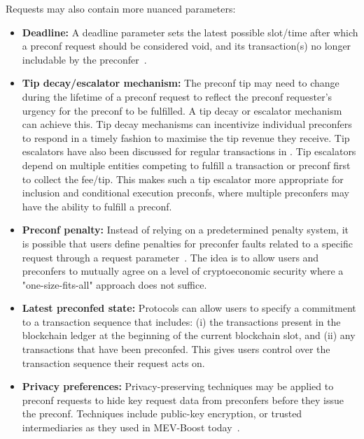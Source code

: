 \documentclass[a4paper]{article}
\theoremstyle{boldstyle}
\begin{document}
    Requests may also contain more nuanced parameters:
    \begin{itemize}
        \item \textbf{Deadline:} A deadline parameter sets the latest possible slot/time after which a preconf request should be considered void, and its transaction(s) no longer includable by the preconfer~\cite{W:PreconfirmationsforVanillaBasedRollups}.
        
        \item \textbf{Tip decay/escalator mechanism:} 
        The preconf tip may need to change during the lifetime of a preconf request to reflect the preconf requester's urgency for the preconf to be fulfilled. A tip decay or escalator mechanism can achieve this. Tip decay mechanisms can incentivize individual preconfers to respond in a timely fashion to maximise the tip revenue they receive\cite{W:Documentation-BidDecayMechanism}. Tip escalators have also been discussed for regular transactions in \cite{W:OrderflowauctionsandcentralisationII:orderflowauctions}. Tip escalators depend on multiple entities competing to fulfill a transaction or preconf first to collect the fee/tip. This makes such a tip escalator more appropriate for inclusion and conditional execution preconfs, where multiple preconfers may have the ability to fulfill a preconf.   
        
        \item \textbf{Preconf penalty:} Instead of relying on a predetermined penalty system, it is possible that users define penalties for preconfer faults related to a specific request through a request parameter~\cite{W:User-DefinedPenalties:EnsuringHonestPreconfBehavior, W:Documentation-BidStructure}. The idea is to allow users and preconfers to mutually agree on a level of cryptoeconomic security where a "one-size-fits-all" approach does not suffice.
        
        
        \item \textbf{Latest preconfed state:} 
        Protocols can allow users to specify a commitment to a transaction sequence that includes: (i) the transactions present in the blockchain ledger at the beginning of the current blockchain slot, and (ii) any transactions that have been preconfed. This gives users control over the transaction sequence their request acts on.  ~\cite{W:AnalyzingBFTProposer-PromisedPreconfirmations}


        \item \textbf{Privacy preferences:} 
        Privacy-preserving techniques may be applied to preconf requests to hide key request data from preconfers before they issue the preconf. %
        Techniques include public-key encryption, or trusted intermediaries as they used in MEV-Boost today~\cite{W:BasedPreconfirmationswithMulti-roundMEV-Boost, W:AnalyzingBFTProposer-PromisedPreconfirmations, W:Documentation-BidStructure, W:Towardsanimplementationofbasedpreconfirmationsleveragingrestaking}.
         
    \end{itemize}
    
\end{document}
